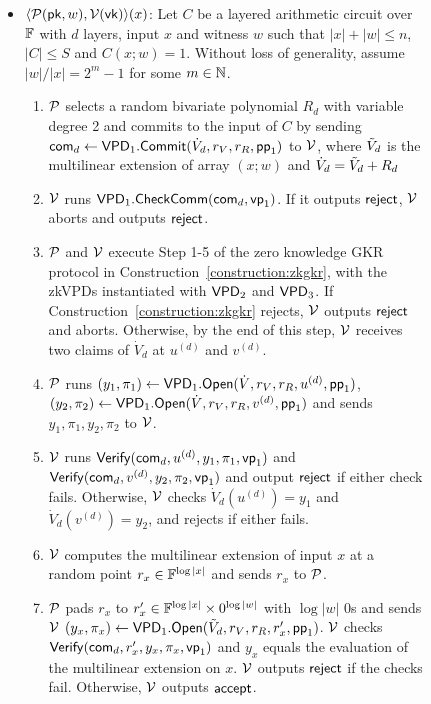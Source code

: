 \begin{figure}[t!]
{{{{\begin{construction}
\begin{itemize}
		\item $\langle\P(\pk,w), \V(\vk)\rangle(x)$: Let $C$ be a layered arithmetic circuit over $\F$ with $d$ layers, input $x$ and witness $w$ such that $|x|+|w|\le n$, $|C|\le S$ and $C(x;w) =1$. Without loss of generality, assume $|w|/|x| = 2^m -1$ for some $m\in\N$.
		\begin{enumerate}
			\item $\P$ selects a random bivariate polynomial $R_d$ with variable degree 2 and commits to the input of $C$ by sending $\comm_d\leftarrow\VPD_1.\Commit(\dot{V}_d, r_V, r_R, \pp_1)$ to $\V$, where $\tV_d$ is the multilinear extension of array $(x;w)$ and $\dot{V}_d=\tV_d+R_d$
			\item $\V$ runs $\VPD_1.\CheckComm(\comm_d,\vp_1)$. If it outputs $\reject$, $\V$ aborts and outputs $\reject$.  
			\item $\P$ and $\V$ execute Step 1-5 of the zero knowledge GKR protocol in Construction~\ref{construction:zkgkr}, with the zkVPDs instantiated with $\VPD_2$ and $\VPD_3$. If Construction~\ref{construction:zkgkr} rejects, $\V$ outputs $\reject$ and aborts. Otherwise, by the end of this step, $\V$ receives two claims of $\dot{V}_d$ at $u^{(d)}$ and $v^{(d)}$.
			\item $\P$ runs $(y_1,\pi_1)\leftarrow\VPD_1.\Open(\dot{V}, r_V, r_R,u^{(d)},\pp_1)$,  $(y_2,\pi_2)\leftarrow\VPD_1.\Open(\dot{V}, r_V, r_R, v^{(d)},\pp_1)$ and sends $y_1,\pi_1,y_2,\pi_2$ to $\V$.
			\item $\V$ runs $\Verify(\comm_d,u^{(d)},y_1,\pi_1,\vp_1)$ and $\Verify(\comm_d,v^{(d)},y_2,\pi_2,\vp_1)$ and output $\reject$ if either check fails. Otherwise, $\V$ checks $\dot{V}_d(u^{(d)}) = y_1$ and $\dot{V}_d(v^{(d)}) = y_2$, and rejects if either fails.
			\item $\V$ computes the multilinear extension of input $x$ at a random point $r_x\in\F^{\log |x|}$ and sends $r_x$ to $\P$.
			\item $\P$ pads $r_x$ to $r'_x\in\F^{\log |x|}\times 0^{\log |w|}$ with $\log |w|$ 0s and sends $\V$ $(y_x,\pi_x)\leftarrow\VPD_1.\Open(\tV_d, r_V, r_R, r'_x,\pp_1)$. $\V$ checks $\Verify(\comm_d,r'_x,y_x,\pi_x,\vp_1)$ and $y_x$ equals the evaluation of the multilinear extension on $x$. $\V$ outputs $\reject$ if the checks fail. Otherwise, $\V$ outputs $\accept$.
		\end{enumerate}
		
	\end{itemize}
\end{construction}}}}}
\vspace{-0.2in}
\end{figure}
